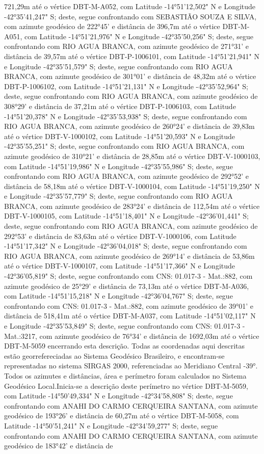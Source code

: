 721,29m  até o vértice DBT-M-A052, com Latitude -14°51'12,502" N e Longitude -42°35'41,247" S; deste, segue confrontando com SEBASTIÃO SOUZA E SILVA, com azimute geodésico de 222°45' e distância de 
396,7m  até o vértice DBT-M-A051, com Latitude -14°51'21,976" N e Longitude -42°35'50,256" S; deste, segue confrontando com RIO AGUA BRANCA, com azimute geodésico de 271°31' e distância de 
39,57m  até o vértice DBT-P-1006101, com Latitude -14°51'21,941" N e Longitude -42°35'51,579" S; deste, segue confrontando com RIO AGUA BRANCA, com azimute geodésico de 301°01' e distância de 
48,32m  até o vértice DBT-P-1006102, com Latitude -14°51'21,131" N e Longitude -42°35'52,964" S; deste, segue confrontando com RIO AGUA BRANCA, com azimute geodésico de 308°29' e distância de 
37,21m  até o vértice DBT-P-1006103, com Latitude -14°51'20,378" N e Longitude -42°35'53,938" S; deste, segue confrontando com RIO AGUA BRANCA, com azimute geodésico de 260°24' e distância de 
39,83m  até o vértice DBT-V-1000102, com Latitude -14°51'20,593" N e Longitude -42°35'55,251" S; deste, segue confrontando com RIO AGUA BRANCA, com azimute geodésico de 310°21' e distância de 
28,85m  até o vértice DBT-V-1000103, com Latitude -14°51'19,986" N e Longitude -42°35'55,986" S; deste, segue confrontando com RIO AGUA BRANCA, com azimute geodésico de 292°52' e distância de 
58,18m  até o vértice DBT-V-1000104, com Latitude -14°51'19,250" N e Longitude -42°35'57,779" S; deste, segue confrontando com RIO AGUA BRANCA, com azimute geodésico de 283°24' e distância de 
112,54m  até o vértice DBT-V-1000105, com Latitude -14°51'18,401" N e Longitude -42°36'01,441" S; deste, segue confrontando com RIO AGUA BRANCA, com azimute geodésico de 292°53' e distância de 
83,63m  até o vértice DBT-V-1000106, com Latitude -14°51'17,342" N e Longitude -42°36'04,018" S; deste, segue confrontando com RIO AGUA BRANCA, com azimute geodésico de 269°14' e distância de 
53,86m  até o vértice DBT-V-1000107, com Latitude -14°51'17,366" N e Longitude -42°36'05,819" S; deste, segue confrontando com CNS: 01.017-3 - Mat.:882, com azimute geodésico de 25°29' e distância de 
73,13m  até o vértice DBT-M-A036, com Latitude -14°51'15,218" N e Longitude -42°36'04,767" S; deste, segue confrontando com CNS: 01.017-3 - Mat.:882, com azimute geodésico de 39°01' e distância de 
518,41m  até o vértice DBT-M-A037, com Latitude -14°51'02,117" N e Longitude -42°35'53,849" S; deste, segue confrontando com CNS: 01.017-3 - Mat.:3217, com azimute geodésico de 76°34' e distância de 
1692,03m  até o vértice DBT-M-5059 encerrando esta descrição. Todas as coordenadas aqui descritas estão georrefereciadas ao Sistema Geodésico Brasileiro, e encontram-se representadas no sistema SIRGAS 2000, referenciadas ao Meridiano Central -39°. Todos os azimutes e distâncias, área e perímetro foram calculados no Sistema Geodésico Local.Inicia-se a descrição deste perímetro no vértice DBT-M-5059, com Latitude -14°50'49,334" N e Longitude -42°34'58,808" S; deste, segue confrontando com ANAHI DO CARMO CERQUEIRA SANTANA, com azimute geodésico de 193°26' e distância de 60,27m até o vértice DBT-M-5058, com Latitude -14°50'51,241" N e Longitude -42°34'59,277" S; deste, segue confrontando com ANAHI DO CARMO CERQUEIRA SANTANA, com azimute geodésico de 183°42' e distância de 

